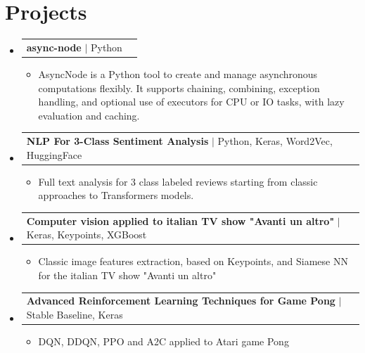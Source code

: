 \documentclass[letterpaper,11pt]{article}
\makeatletter
\newcommand{\resumeItem}[1]{
  \item\small{
    {#1 \vspace{-2pt}}
  }
}
\newcommand{\resumeProjectHeading}[2]{
    \item
    \begin{tabular*}{0.97\textwidth}{l@{\extracolsep{\fill}}r}
      \small#1 & #2 \\
    \end{tabular*}\vspace{-7pt}
}
\newcommand{\resumeSubHeadingListStart}{\begin{itemize}[leftmargin=0.15in, label={}]}
\newcommand{\resumeSubHeadingListEnd}{\end{itemize}}
\newcommand{\resumeItemListStart}{\begin{itemize}}
\newcommand{\resumeItemListEnd}{\end{itemize}\vspace{-5pt}}
\makeatother
\begin{document}
\section{Projects}
    \resumeSubHeadingListStart
        \resumeProjectHeading
          {\textbf{async-node} $|$ Python}{}
          \resumeItemListStart
            \resumeItem{AsyncNode is a Python tool to create and manage asynchronous computations flexibly. It supports chaining, combining, exception handling, and optional use of executors for CPU or IO tasks, with lazy evaluation and caching.}
        \resumeItemListEnd
        \resumeProjectHeading
          {\textbf{NLP For 3-Class Sentiment Analysis} $|$ Python, Keras, Word2Vec, HuggingFace}{}
          \resumeItemListStart
            \resumeItem{Full text analysis for 3 class labeled reviews starting from classic approaches to Transformers models.}
        \resumeItemListEnd
        \resumeProjectHeading
          {\textbf{Computer vision applied to italian TV show "Avanti un altro"} $|$ Keras, Keypoints, XGBoost}{}
          \resumeItemListStart
            \resumeItem{Classic image features extraction, based on Keypoints, and Siamese NN
            for the italian TV show "Avanti un altro"}
        \resumeItemListEnd
        \resumeProjectHeading
          {\textbf{Advanced Reinforcement Learning Techniques for Game Pong} $|$ Stable Baseline, Keras}{}
          \resumeItemListStart
            \resumeItem{DQN, DDQN, PPO and A2C applied to Atari game Pong}
        \resumeItemListEnd
    \resumeSubHeadingListEnd
\end{document}
